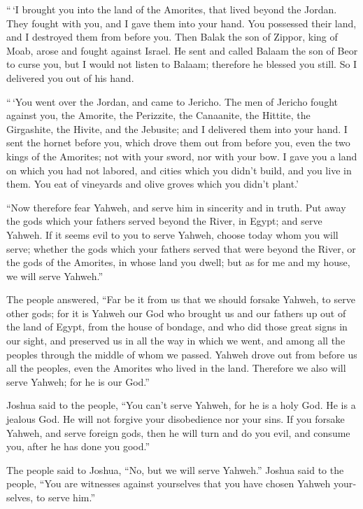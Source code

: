 \begin{paracol}{2}
\begin{otherlanguage}{english}
 ``\,`I brought you into the land of the Amorites, that
lived beyond the Jordan. They fought with you, and I gave them into your
hand. You possessed their land, and I destroyed them from before you.
 Then Balak the son of Zippor, king of Moab, arose and
fought against Israel. He sent and called Balaam the son of Beor to
curse you,  but I would not listen to Balaam; therefore
he blessed you still. So I delivered you out of his hand.

 ``\,`You went over the Jordan, and came to Jericho. The
men of Jericho fought against you, the Amorite, the Perizzite, the
Canaanite, the Hittite, the Girgashite, the Hivite, and the Jebusite;
and I delivered them into your hand.  I sent the hornet
before you, which drove them out from before you, even the two kings of
the Amorites; not with your sword, nor with your bow.  I
gave you a land on which you had not labored, and cities which you
didn't build, and you live in them. You eat of vineyards and olive
groves which you didn't plant.'

 ``Now therefore fear Yahweh, and serve him in sincerity
and in truth. Put away the gods which your fathers served beyond the
River, in Egypt; and serve Yahweh.  If it seems evil to
you to serve Yahweh, choose today whom you will serve; whether the gods
which your fathers served that were beyond the River, or the gods of the
Amorites, in whose land you dwell; but as for me and my house, we will
serve Yahweh.''

 The people answered, ``Far be it from us that we should
forsake Yahweh, to serve other gods;  for it is Yahweh
our God who brought us and our fathers up out of the land of Egypt, from
the house of bondage, and who did those great signs in our sight, and
preserved us in all the way in which we went, and among all the peoples
through the middle of whom we passed.  Yahweh drove out
from before us all the peoples, even the Amorites who lived in the land.
Therefore we also will serve Yahweh; for he is our God.''

 Joshua said to the people, ``You can't serve Yahweh, for
he is a holy God. He is a jealous God. He will not forgive your
disobedience nor your sins.  If you forsake Yahweh, and
serve foreign gods, then he will turn and do you evil, and consume you,
after he has done you good.''

 The people said to Joshua, ``No, but we will serve
Yahweh.''  Joshua said to the people, ``You are witnesses
against yourselves that you have chosen Yahweh yourselves, to serve
him.''


\end{otherlanguage}
\end{paracol}
